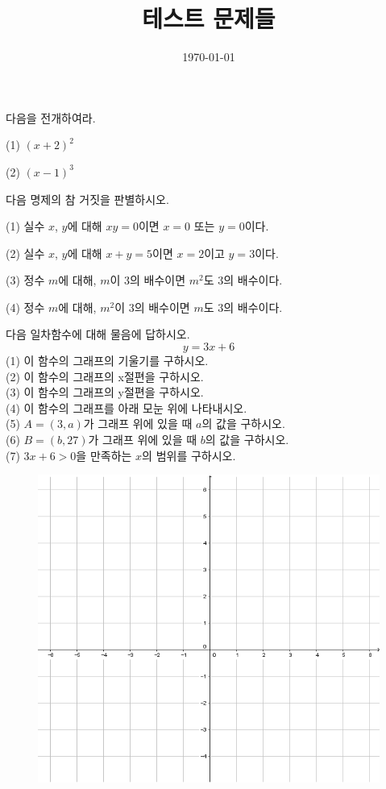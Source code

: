 \documentclass{article}
\newcommand\bp[1]{\begin{mdframed}[frametitle={#1},skipabove=10pt,skipbelow=20pt,innertopmargin=5pt,innerbottommargin=40pt]}
\newcommand\ep{\end{mdframed}\par}
\newcommand{\vs}{\vspace{0.05\textheight}}
\newcommand{\vvs}{\vspace{0.1\textheight}}
\begin{document}
\title{테스트 문제들}
\author{}
\date{\today}
\maketitle


\bp{01}
다음을 전개하여라.\par
(1) \((x+2)^2\)\par
(2) \((x-1)^3\)
\vs\ep

\bp{02}
다음 명제의 참 거짓을 판별하시오.\par
(1) 실수 \(x\), \(y\)에 대해 \(xy=0\)이면 \(x=0\) 또는 \(y=0\)이다.\par
(2) 실수 \(x\), \(y\)에 대해 \(x+y=5\)이면 \(x=2\)이고 \(y=3\)이다.\par
(3) 정수 \(m\)에 대해, \(m\)이 3의 배수이면 \(m^2\)도 3의 배수이다.\par
(4) 정수 \(m\)에 대해, \(m^2\)이 3의 배수이면 \(m\)도 3의 배수이다.
\vs\ep

\bp{03}
다음 일차함수에 대해 물음에 답하시오.
\[y=3x+6\]
(1) 이 함수의 그래프의 기울기를 구하시오.\\
(2) 이 함수의 그래프의 x절편을 구하시오.\\
(3) 이 함수의 그래프의 y절편을 구하시오.\\
(4) 이 함수의 그래프를 아래 모눈 위에 나타내시오.\\
(5) \(A=(3,a)\)가 그래프 위에 있을 때 \(a\)의 값을 구하시오.\\
(6) \(B=(b,27)\)가 그래프 위에 있을 때 \(b\)의 값을 구하시오.\\
(7) \(3x+6>0\)을 만족하는 \(x\)의 범위를 구하시오.\\
\vvs\ep
\begin{figure}[h!]
\centering
\includegraphics[width=.7\textwidth]{grid}
\end{figure}
\end{document}
